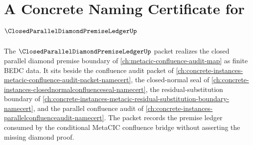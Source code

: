 \chapter{A Concrete Naming Certificate for $\ClosedParallelDiamondPremiseLedgerUp$}
\label{ch:concrete-instances-closed-parallel-diamond-premise-ledger-namecert}

The $\ClosedParallelDiamondPremiseLedgerUp$ packet realizes the closed parallel diamond premise boundary of \autoref{ch:metacic-confluence-audit-map} as finite BEDC data. It sits beside the confluence audit packet of \autoref{ch:concrete-instances-metacic-confluence-audit-packet-namecert}, the closed-normal seal of \autoref{ch:concrete-instances-closednormalconfluenceseal-namecert}, the residual-substitution boundary of \autoref{ch:concrete-instances-metacic-residual-substitution-boundary-namecert}, and the parallel confluence audit of \autoref{ch:concrete-instances-parallelconfluenceaudit-namecert}. The packet records the premise ledger consumed by the conditional MetaCIC confluence bridge without asserting the missing diamond proof.

